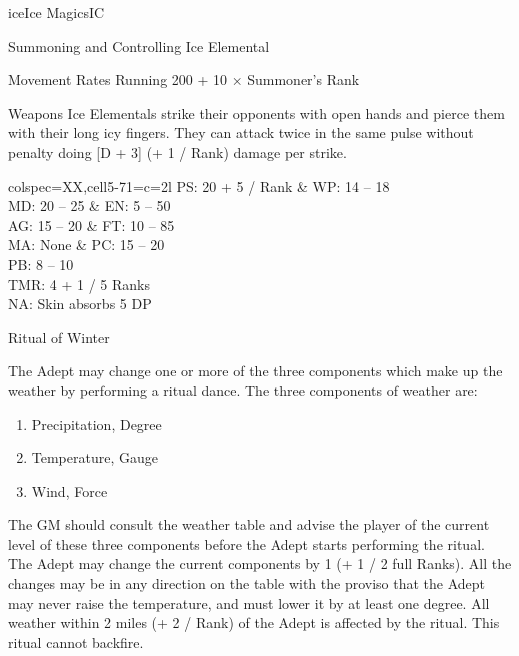 \begin{College}[1.5]{ice}{Ice Magics}{IC}
\begin{ritual}[R-2]{Summoning and Controlling Ice Elemental}
\begin{effects}
\begin{Description}
\item[Movement Rates] Running 200 + 10 × Summoner’s Rank

\item[Weapons] Ice Elementals strike their opponents with open hands
  and pierce them with their long icy fingers. They can attack twice
  in the same pulse without penalty doing [D + 3] (+ 1 / Rank) damage
  per strike.
\end{Description}

\begin{dqtblr}{colspec={XX},cell{5-7}{1}={c=2}{l}}
PS: 20 + 5 / Rank	& WP: 14 -- 18 \\
MD: 20 -- 25		& EN: 5 -- 50 \\
AG: 15 -- 20		& FT: 10 -- 85 \\
MA: None		& PC: 15 -- 20 \\
PB: 8 -- 10		\\
TMR: 4 + 1 / 5 Ranks	\\
NA: Skin absorbs 5 DP	\\
\end{dqtblr}
\end{effects}
\end{ritual}

\begin{ritual}[R-3]{Ritual of Winter}

\begin{effects}
The Adept may change one or more of the three components which make up
the weather by performing a ritual dance. The three components of
weather are:
\begin{enumerate}
\item Precipitation, Degree 
\item Temperature, Gauge 
\item Wind, Force 
\end{enumerate}

The GM should consult the weather table and advise the player of the
current level of these three components before the Adept starts
performing the ritual.  The Adept may change the current components by
1 (+ 1 / 2 full Ranks).  All the changes may be in any direction on
the table with the proviso that the Adept may never raise the
temperature, and must lower it by at least one degree.  All weather
within 2 miles (+ 2 / Rank) of the Adept is affected by the
ritual. This ritual cannot backfire.
\end{effects}
\end{ritual}


\end{College}
